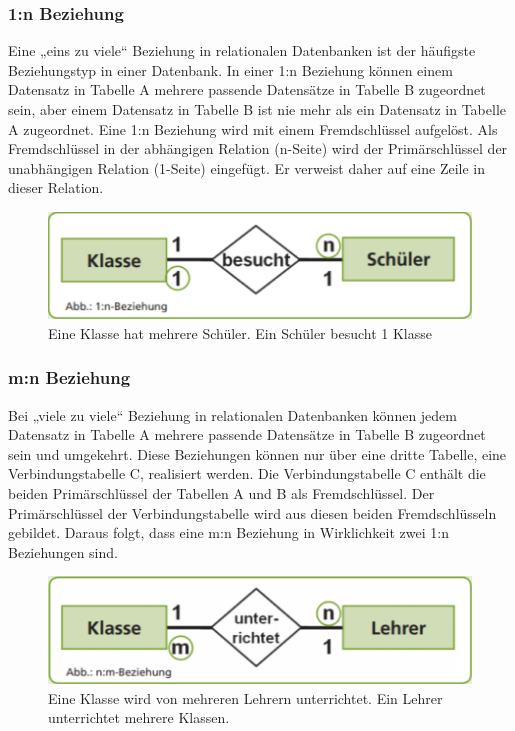  \subsubsection{1:n Beziehung}

 Eine „eins zu viele“ Beziehung in relationalen Datenbanken ist der häufigste Beziehungstyp in einer Datenbank. In einer 1:n Beziehung können einem Datensatz in Tabelle A mehrere passende Datensätze in Tabelle B zugeordnet sein, aber einem Datensatz in Tabelle B ist nie mehr als ein Datensatz in Tabelle A zugeordnet. Eine 1:n Beziehung wird mit einem Fremdschlüssel aufgelöst.
Als Fremdschlüssel in der abhängigen Relation (n-Seite) wird der Primärschlüssel der unabhängigen Relation (1-Seite) eingefügt. Er verweist daher auf eine Zeile in dieser Relation.

\begin{figure}[H]
    \centering
    \includegraphics[width=.8\textwidth]{Content/images/modellierung/1n.png}
    \caption{Eine Klasse hat mehrere Schüler. Ein Schüler besucht 1 Klasse}
    \label{fig:modellierung:1n}
 \end{figure}

 \subsubsection{m:n Beziehung}

 Bei „viele zu viele“ Beziehung in relationalen Datenbanken können jedem Datensatz in Tabelle A mehrere passende Datensätze in Tabelle B zugeordnet sein und umgekehrt. Diese Beziehungen können nur über eine dritte Tabelle, eine Verbindungstabelle C, realisiert werden. Die Verbindungstabelle C enthält die beiden Primärschlüssel der Tabellen A und B als Fremdschlüssel. Der Primärschlüssel der Verbindungstabelle wird aus diesen beiden Fremdschlüsseln gebildet. Daraus folgt, dass eine m:n Beziehung in Wirklichkeit zwei 1:n Beziehungen sind.

\begin{figure}[H]
    \centering
    \includegraphics[width=.8\textwidth]{Content/images/modellierung/mn.png}
    \caption{Eine Klasse wird von mehreren Lehrern unterrichtet. Ein Lehrer unterrichtet mehrere Klassen.}
    \label{fig:modellierung:mn}
\end{figure}


